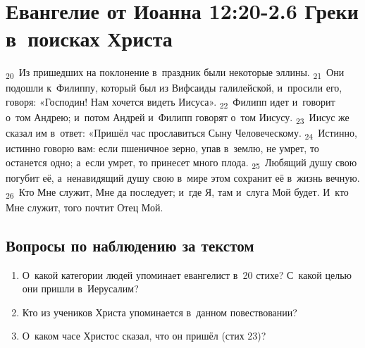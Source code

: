 \documentclass[a4paper,12pt]{article}
\begin{document}

\section{Евангелие от Иоанна 12:20-2.6 Греки в~поисках Христа}

\textsubscript{20}~Из пришедших на поклонение в~праздник были некоторые эллины. \textsubscript{21}~Они подошли к~Филиппу, который был из Вифсаиды галилейской, и~просили его, говоря: «Господин! Нам хочется видеть Иисуса». \textsubscript{22}~Филипп идет и~говорит о~том Андрею; и~потом Андрей и~Филипп говорят о~том Иисусу. \textsubscript{23}~Иисус же сказал им в~ответ: «Пришёл час прославиться Сыну Человеческому. \textsubscript{24}~Истинно, истинно говорю вам: если пшеничное зерно, упав в~землю, не умрет, то останется одно; а~если умрет, то принесет много плода. \textsubscript{25}~Любящий душу свою погубит её, а~ненавидящий душу свою в~мире этом сохранит её в~жизнь вечную. \textsubscript{26}~Кто Мне служит, Мне да последует; и~где Я, там и~слуга Мой будет. И~кто Мне служит, того почтит Отец Мой.

\subsection*{Вопросы по наблюдению за текстом}
\begin{enumerate}
    \item О~какой категории людей упоминает евангелист в~20 стихе? С~какой целью они пришли в~Иерусалим? 
    
    \myline
    
    \myline
    \item Кто из учеников Христа упоминается в~данном повествовании? 
    
    \myline
    
    \myline
    \item О~каком часе Христос сказал, что он пришёл (стих 23)? 
    
    \myline
    
    \myline
\end{enumerate}
\end{document}

